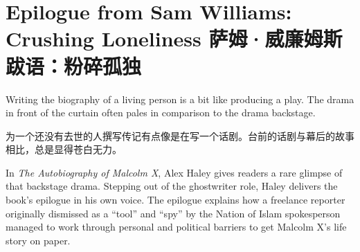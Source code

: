 

\chapter{\ifdefined\eng
Epilogue from Sam Williams: Crushing Loneliness
\fi
\ifdefined\chs
萨姆·威廉姆斯跋语：粉碎孤独
\fi}

\ifdefined{}
\fi

\ifdefined{}
\fi

\ifdefined\eng
Writing the biography of a living person is a bit like producing a play. The drama in front of the curtain often pales in comparison to the drama backstage.
\fi

\ifdefined\chs
为一个还没有去世的人撰写传记有点像是在写一个话剧。台前的话剧与幕后的故事相比，总是显得苍白无力。
\fi

\ifdefined\eng
In \textit{The Autobiography of Malcolm X}, Alex Haley gives readers a rare glimpse of that backstage drama. Stepping out of the ghostwriter role, Haley delivers the book's epilogue in his own voice. The epilogue explains how a freelance reporter originally dismissed as a ``tool'' and ``spy'' by the Nation of Islam spokesperson managed to work through personal and political barriers to get Malcolm X's life story on paper.
\fi

